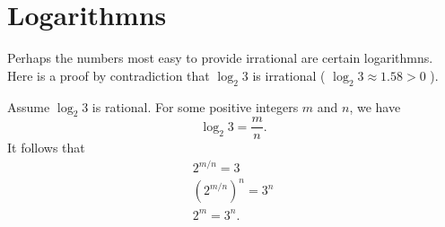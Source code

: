 \documentclass{article}
\begin{document}
    \section{Logarithmns}
    Perhaps the numbers most easy to provide irrational are certain logarithmns.
    Here is a proof by contradiction that \( \log_2 3 \) is irrational ( \( \log_2 3 \approx 1.58 > 0 \) ).

    Assume \( \log_2 3 \) is rational. For some positive integers \( m \) and \( n \), we have
    \begin{equation*}
        \log_2 3 = \frac{m}{n}.
    \end{equation*}
    It follows that
    \begin{align*}
        2^{m/n} = 3 \\
        {(2^{m/n})}^n = 3^n \\
        2^m = 3^n.
    \end{align*}
\end{document}
